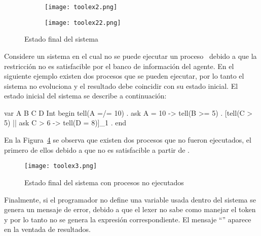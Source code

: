 \begin{figure}[htbp] %
   \centering
   \begin{subfigure}[b]{5in}
      \texttt{[image: toolex2.png]}
      \caption{}
      \label{fig:Ng1} 
   \end{subfigure}
   \begin{subfigure}[b]{5in}
      \texttt{[image: toolex22.png]}
      \caption{}
      \label{fig:Ng2}
   \end{subfigure}
   \caption{Estado final del sistema}
   \label{fig:toolout1}
\end{figure}

Considere un sistema en el cual no se puede ejecutar un proceso \ask \ debido a que la restricci\'on no es satisfacible por el banco de informaci\'on del agente. En el siguiente ejemplo existen dos procesos que se pueden ejecutar, por lo tanto el sistema no evoluciona y el resultado debe coincidir con su estado inicial. El estado inicial del sistema se describe a continuaci\'on:

\begin{sccp}
var A B C D Int
begin
tell(A =/= 10) .
ask A = 10 -> tell(B >= 5) .
[tell(C > 5) || ask C > 6 -> tell(D = 8)]_1 .
end
\end{sccp}

En la Figura~\ref{fig:toolout3} se observa que existen dos procesos que no fueron ejecutados, el primero de ellos debido a que  no es satisfacible a partir de . 

\begin{figure}[htbp] %
   \centering
   \texttt{[image: toolex3.png]} 
   \caption{Estado final del sistema con procesos no ejecutados}
   \label{fig:toolout3}
\end{figure}

Finalmente, si el programador no define una variable usada dentro del sistema se genera un mensaje de error, debido a que el lexer no sabe como manejar el token y por lo tanto no se genera la expresi\'on correspondiente. El mensaje ``'' aparece en la ventada de resultados.


